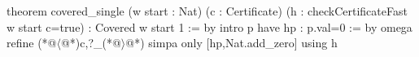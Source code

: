 theorem covered_single (w start : Nat) (c : Certificate)
    (h : checkCertificateFast w start c=true) : Covered w start 1 := by
  intro p
  have hp : p.val=0 := by omega
  refine (*@$\langle$@*)c,?_(*@$\rangle$@*)
  simpa only [hp,Nat.add_zero] using h
